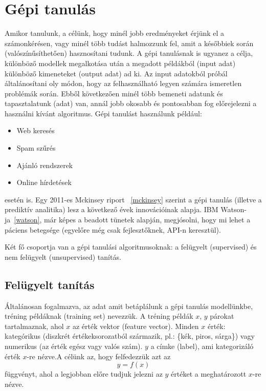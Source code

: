 \documentclass[a4paper,12pt]{article}
\begin{document}
\section{Gépi tanulás}

Amikor tanulunk, a célünk, hogy minél jobb eredményeket érjünk el a számonkérésen, vagy minél több tudást halmozzunk fel, amit a későbbiek során (valószínűsíthetően) hasznosítani tudunk. A gépi tanulásnak is ugyanez a célja, különböző modellek megalkotása után a megadott példákból (input adat) különböző kimeneteket (output adat) ad ki. Az input adatokból próbál általánosítani oly módon, hogy az felhasználható legyen számára ismeretlen problémák során. Ebből következően minél több bemeneti adatunk és tapasztalatunk (adat) van, annál jobb okosabb és pontosabban fog előrejelezni a használni kívánt algoritmus. Gépi tanulást használunk például: 
\begin{itemize}
\item Web keresés
\item Spam szűrés
\item Ajánló rendszerek
\item Online hírdetések
\end{itemize}
esetén is. 
Egy 2011-es Mckinsey riport ~\ref{mckinsey} szerint a gépi tanulás (illetve a prediktív analitika) lesz a következő évek innovációinak alapja. IBM Watson-ja~\ref{watson}, már képes a beadott tünetek alapján, megjósolni, hogy mi lehet a páciens betegsége (egyelőre még csak fejlesztőknek, API-n keresztül). \linebreak

Két fő csoportja van a gépi tanulási algoritmusoknak: a felügyelt (supervised) és nem felügyelt (unsupervised) tanítás.

\subsection{Felügyelt tanítás}

Általánosan fogalmazva, az adat amit betáplálunk a gépi tanulás modellünkbe, tréning példáknak (training set) nevezzük. A tréning példák $x$, $y$ párokat tartalmaznak, ahol $x$ az érték vektor (feature vector). Minden $x$ érték: kategórikus (diszkrét értékeksorozatból származik, pl.: \{kék, piros, sárga\}) vagy numerikus (az érték egész vagy valós szám). $y$ a címke (label), ami kategorizáló érték $x$-re nézve.A célünk az, hogy felfedezzük azt az 
\begin{equation*} y=f(x)
\end{equation*}
függvényt, ahol a legjobban előre tudjuk jelezni az $y$ értéket a meghatározott $x$-re nézve.
\end{document}
